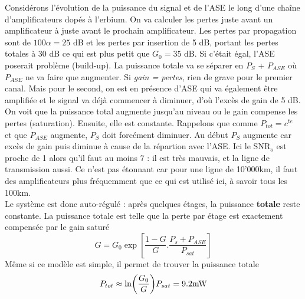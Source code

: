 Considérons l'évolution de la puissance du signal et de l'ASE le long d'une chaîne d'amplificateurs 
dopés à l'erbium. On va calculer les pertes juste avant un amplificateur à juste avant le prochain
amplificateur. Les pertes par propagation sont de $100\alpha=25$ dB et les pertes par insertion de 
5 dB, portant les pertes totales à 30 dB ce qui est plus petit que $G_0 = 35$ dB. Si c'était égal, 
l'ASE poserait problème (build-up). La puissance totale va se séparer en $P_S$ + $P_{ASE}$ où 
$P_{ASE}$ ne va faire que augmenter. Si \textit{gain = pertes}, rien de grave pour le premier 
canal. Mais pour le second, on est en présence d'ASE qui va également être amplifiée et le signal 
va déjà commencer à diminuer, d'où l'excès de gain de 5 dB.\\

On voit que la puissance total augmente jusqu'au niveau ou le gain compense les pertes (saturation). 
Ensuite, elle est constante. Rappelons que comme $P_{tot}= c^{te}$ et que $P_{ASE}$ augmente, 
$P_S$ doit forcément diminuer. Au début $P_S$ augmente car excès de gain puis diminue à cause de la
répartion avec l'ASE. Ici le SNR$_o$ est proche de 1 alors qu'il faut au moins 7 : il est très mauvais, 
et la ligne de transmission aussi. Ce n'est pas étonnant car pour une ligne de 10'000km, il faut des
amplificateurs plus fréquemment que ce qui est utilisé ici, à savoir tous les 100km.\\

Le système est donc auto-régulé : après quelques étages, la puissance \textbf{totale} reste constante. La 
puissance totale est telle que la perte par étage est exactement compensée par le gain saturé
\begin{equation}
G = {G_0}\exp [\frac{{1 - G}}{G}.\frac{{{P_s} + {P_{ASE}}}}{{{P_{sat}}}}]
\end{equation}
Même si ce modèle est simple, il permet de trouver la puissance totale
\begin{equation}
{P_{tot}} \approx \ln (\frac{{{G_0}}}{G}){P_{sat}} = {\rm{9}}{\rm{.2 mW}}
\end{equation}

